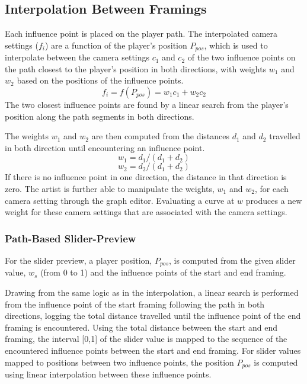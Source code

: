\subsection{Interpolation Between Framings} \label{interpolationChapter}
Each influence point is placed on the player path. The interpolated camera settings ($f_{i}$) are a function of the player's position $P_{pos}$, which is used to interpolate between the camera settings $c_1$ and $c_2$ of the two influence points on the path closest to the player's position in both directions, with weights $w_1$ and $w_2$ based on the positions of the influence points.
\begin{equation}
f_{i} = f(P_{pos}) = w_1c_1+w_2c_2
\end{equation}
The two closest influence points are found by a linear search from the player's position along the path segments in both directions.

The weights $w_1$ and $w_2$ are then computed from the distances $d_1$ and $d_2$ travelled in both direction until encountering an influence point.
\begin{equation}
w_1 = {d_1}/(d_1 + d_2)
\end{equation}
\begin{equation}
w_2 = {d_2}/(d_1 + d_2)
\end{equation}
If there is no influence point in one direction, the distance in that direction is zero. The artist is further able to manipulate the weights, $w_1$ and $w_2$, for each camera setting through the graph editor. Evaluating a curve at $w$ produces a new weight for these camera settings that are associated with the camera settings.


\subsubsection{Path-Based Slider-Preview}
For the slider preview, a player position, $P_{pos}$, is computed from the given slider value, $w_s$ (from 0 to 1) and the influence points of the start and end framing.

Drawing from the same logic as in the interpolation, a linear search is performed from the influence point of the start framing following the path in both directions, logging the total distance travelled until the influence point of the end framing is encountered. Using the total distance between the start and end framing, the interval [0,1] of the slider value is mapped to the sequence of the encountered influence points between the start and end framing. For slider values mapped to positions between two influence points, the position $P_{pos}$ is computed using linear interpolation between these influence points.


